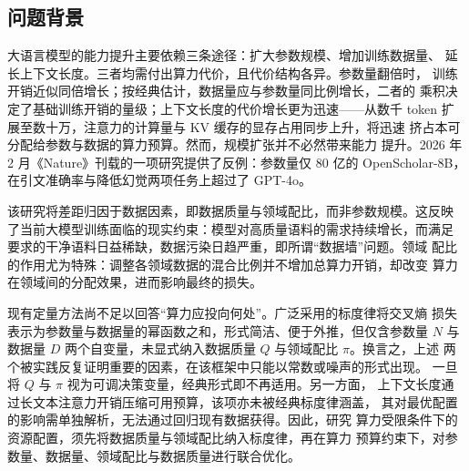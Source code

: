 \documentclass[bwprint]{gmcmthesis}
\numberwithin{equation}{section}
\numberwithin{figure}{section}
\numberwithin{table}{section}
\begin{document}

\subsection{问题背景}

大语言模型的能力提升主要依赖三条途径：扩大参数规模、增加训练数据量、
延长上下文长度。三者均需付出算力代价，且代价结构各异。参数量翻倍时，
训练开销近似同倍增长；按经典估计，数据量应与参数量同比例增长，二者的
乘积决定了基础训练开销的量级；上下文长度的代价增长更为迅速——从数千
token 扩展至数十万，注意力的计算量与 KV 缓存的显存占用同步上升，将迅速
挤占本可分配给参数与数据的算力预算。然而，规模扩张并不必然带来能力
提升。2026 年 2 月《Nature》刊载的一项研究提供了反例：参数量仅 80 亿的
OpenScholar-8B，在引文准确率与降低幻觉两项任务上超过了 GPT-4o。

该研究将差距归因于数据因素，即数据质量与领域配比，而非参数规模。这反映
了当前大模型训练面临的现实约束：模型对高质量语料的需求持续增长，而满足
要求的干净语料日益稀缺，数据污染日趋严重，即所谓“数据墙”问题。领域
配比的作用尤为特殊：调整各领域数据的混合比例并不增加总算力开销，却改变
算力在领域间的分配效果，进而影响最终的损失\cite{xia_regmix_2024}。

现有定量方法尚不足以回答“算力应投向何处”。广泛采用的标度律将交叉熵
损失表示为参数量与数据量的幂函数之和，形式简洁、便于外推，但仅含参数量
$N$ 与数据量 $D$ 两个自变量，未显式纳入数据质量 $Q$ 与领域配比
$\pi$\cite{hoffmann_training_2022,bahri_explaining_2024}。换言之，上述
两个被实践反复证明重要的因素，在该框架中只能以常数或噪声的形式出现。
一旦将 $Q$ 与 $\pi$ 视为可调决策变量，经典形式即不再适用。另一方面，
上下文长度通过长文本注意力开销压缩可用预算，该项亦未被经典标度律涵盖，
其对最优配置的影响需单独解析，无法通过回归现有数据获得。因此，研究
算力受限条件下的资源配置，须先将数据质量与领域配比纳入标度律，再在算力
预算约束下，对参数量、数据量、领域配比与数据质量进行联合优化。

%
%
\end{document}
